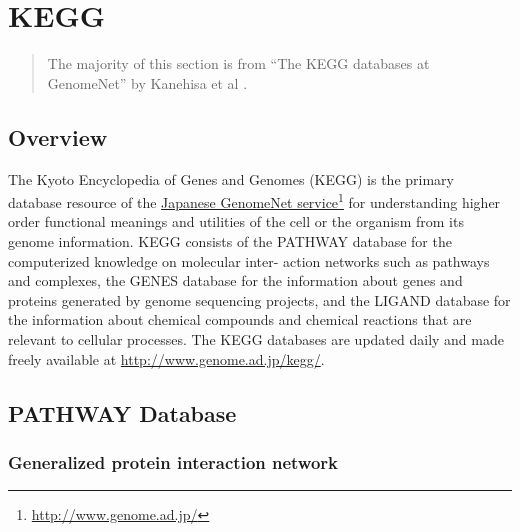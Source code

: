 \section{KEGG}
\label{sect:background_kegg}

\begin{quote}
    The majority of this section is from ``The KEGG databases at GenomeNet'' by
    Kanehisa et al \cite{kegg-basic}.
\end{quote}

\subsection{Overview}
\label{sect:background_kegg_overview}

The Kyoto Encyclopedia of Genes and Genomes (KEGG) is the primary database
resource of the \href{http://www.genome.ad.jp/}{Japanese GenomeNet
service}\footnote{\url{http://www.genome.ad.jp/}} for understanding higher order
functional meanings and utilities of the cell or the organism from its genome
information. KEGG consists of the PATHWAY database for the computerized
knowledge on molecular inter- action networks such as pathways and complexes,
the GENES database for the information about genes and proteins generated by
genome sequencing projects, and the LIGAND database for the information about
chemical compounds and chemical reactions that are relevant to cellular
processes. The KEGG databases are updated daily and made freely available at
\url{http://www.genome.ad.jp/kegg/}.

\subsection{PATHWAY Database}
\label{sect:background_kegg_pathway_database}

\subsubsection{Generalized protein interaction network}

